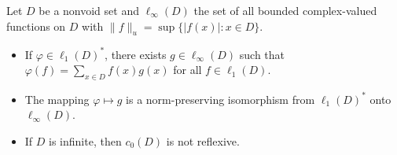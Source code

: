 Let $D$ be a nonvoid set and $\ell_\infty(D)$ the set of all bounded complex-valued functions on $D$ with $\|f\|_u = \sup\{|f(x)| : x \in D\}$.
\begin{itemize}
\item[(a)] If $\varphi \in \ell_1(D)^*$, there exists $g \in \ell_\infty(D)$ such that $\varphi(f) = \sum_{x \in D} f(x) g(x)$ for all $f \in \ell_1(D)$.
\item[(b)] The mapping $\varphi \mapsto g$ is a norm-preserving isomorphism from $\ell_1(D)^*$ onto $\ell_\infty(D)$.
\item[(c)] If $D$ is infinite, then $c_0(D)$ is not reflexive.
\end{itemize}
